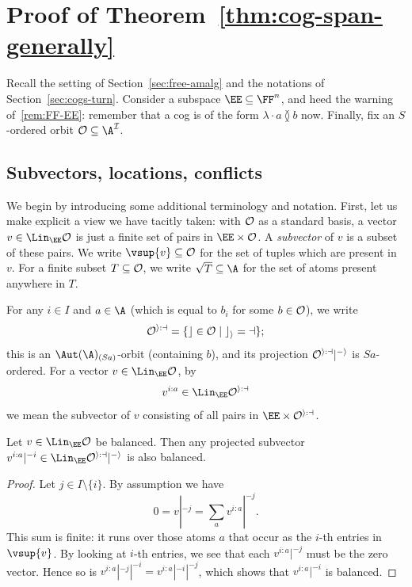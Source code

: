 \section{Proof of Theorem~\ref{thm:cog-span-generally}}\label{sec:appendix-cogs}
Recall the setting of Section~\ref{sec:free-amalg} and the notations of Section~\ref{sec:cogs-turn}.
Consider a subspace $\EE \subseteq \FF^n$, and heed the warning of~\ref{rem:FF-EE}:
remember that a cog is of the form $\lambda \cdot a \between b$ now.
Finally, fix an $S$-ordered orbit $\cal O \subseteq \A^I$.

\subsection{Subvectors, locations, conflicts}
We begin by introducing some additional terminology and notation. First, let us make explicit a view we have tacitly taken:
with $\cal O$ as a standard basis, a vector $v \in \Lin_\EE \cal O$ is just a finite set of pairs in $\EE \times \cal O$.
A \emph{subvector} of $v$ is a subset of these pairs. We write $\vsup{v}\subseteq {\cal O}$ for the set of tuples which are present in $v$. For a finite subset $T\subseteq\cal O$, we write $\sqrt T\subseteq\A$ for the set of atoms present anywhere in $T$.

For any $i \in I$ and $a \in \A$ (which is equal to $b_i$ for some $b \in \cal O$), we write 
\[
    \cal O^{i:a} = \{c \in \cal O \mid c_i = a\};
\]
this is an $\Aut(\A)_{(S a)}$-orbit (containing $b$), and its projection $\cal O^{i:a} |^{-i}$ is $Sa$-ordered.
For a vector $v \in \Lin_\EE \cal O$, by
\[
    v^{i:a} \in \Lin_\EE \cal O^{i:a}
\]
we mean the subvector of $v$ consisting of all pairs in $\EE \times \cal O^{i:a}$.

\begin{lemma}\label{lem:balanced-projected-subvector}
    Let $v \in \Lin_\EE \cal O$ be balanced. 
    Then any projected subvector $v^{i:a}|^{-i} \in \Lin_\EE \cal O^{i:a}|^{-i}$ is also balanced.
\end{lemma}
\begin{proof}
    Let $j \in I \setminus \{i\}$. 
    By assumption we have \[
        0 = v|^{-j} = \sum_a v^{i:a}|^{-j}.
    \]
    This sum is finite: it runs over those atoms $a$ that occur as the $i$-th entries in $\vsup{v}$.
    By looking at $i$-th entries, we see that each $v^{i:a}|^{-j}$ must be the zero vector.
    Hence so is $v^{i:a}|^{-j}|^{-i} = v^{i:a}|^{-i}|^{-j}$,
    which shows that $v^{i:a}|^{-i}$ is balanced.
\end{proof}

